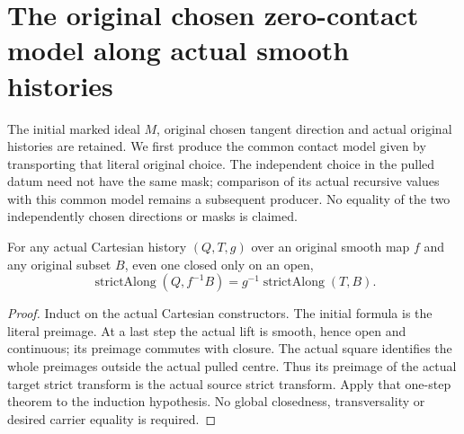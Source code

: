 \section{The original chosen zero-contact model along actual smooth histories}

The initial marked ideal $M$, original chosen tangent direction and actual
original histories are retained. We first produce the common contact model
given by transporting that literal original choice. The independent choice
in the pulled datum need not have the same mask; comparison of its actual
recursive values with this common model remains a subsequent producer.
No equality of the two independently chosen directions or masks is claimed.

\begin{lemma}
\label{hir:smooth-original-contact-entire-strict-carrier}
\leanok
{}
For any actual Cartesian history $(Q,T,g)$ over an original smooth map $f$
and any original subset $B$, even one closed only on an open,
\[
 \operatorname{strictAlong}(Q,f^{-1}B)
 =g^{-1}\operatorname{strictAlong}(T,B).
\]
\end{lemma}
\begin{proof}
Induct on the actual Cartesian constructors. The initial formula is the
literal preimage. At a last step the actual lift is smooth, hence open and
continuous; its preimage commutes with closure. The actual square identifies
the whole preimages outside the actual pulled centre. Thus its preimage of
the actual target strict transform is the actual source strict transform.
Apply that one-step theorem to the induction hypothesis. No global
closedness, transversality or desired carrier equality is required.
\end{proof}


